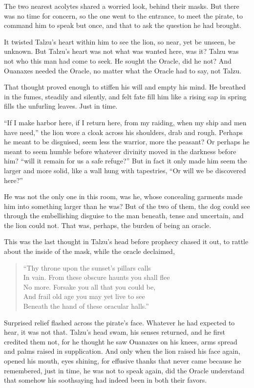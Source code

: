 The two nearest acolytes shared a worried look, behind their masks. But there was no time for concern, so the one went to the entrance, to meet the pirate, to command him to speak but once, and that to ask the question he had brought.

It twisted Talzu's heart within him to see the lion, so near, yet be unseen, be unknown. But Talzu's heart was not what was wanted here, was it? Talzu was not who this man had come to seek. He sought the Oracle, did he not? And Ouanaxes needed the Oracle, no matter what the Oracle had to say, not Talzu.

That thought proved enough to stiffen his will and empty his mind. He breathed in the fumes, steadily and silently, and felt fate fill him like a rising sap in spring fills the unfurling leaves. Just in time.

``If I make harbor here, if I return here, from my raiding, when my ship and men have need,'' the lion wore a cloak across his shoulders, drab and rough. Perhaps he meant to be disguised, seem less the warrior, more the peasant? Or perhaps he meant to seem humble before whatever divinity moved in the darkness before him? ``will it remain for us a safe refuge?'' But in fact it only made him seem the larger and more solid, like a wall hung with tapestries, ``Or will we be discovered here?''

He was not the only one in this room, was he, whose concealing garments made him into something larger than he was? But of the two of them, the dog could see through the embellishing disguise to the man beneath, tense and uncertain, and the lion could not. That was, perhaps, the burden of being an oracle.

This was the last thought in Talzu's head before prophecy chased it out, to rattle about the inside of the mask, while the oracle declaimed,

\begin{verse}
``Thy throne upon the sunset's pillars calls \\
In vain. From these obscure haunts you shall flee \\
No more. Forsake you all that you could be, \\
And frail old age you may yet live to see \\
Beneath the hand of these oracular halls.''
\end{verse}

Surprised relief flashed across the pirate's face. Whatever he had expected to hear, it was not that. Talzu's head swam, his senses returned, and he first credited them not, for he thought he saw Ouanaxes on his knees, arms spread and palms raised in supplication. And only when the lion raised his face again, opened his mouth, eyes shining, for effusive thanks that never came because he remembered, just in time, he was not to speak again, did the Oracle understand that somehow his soothsaying had indeed been in both their favors.

